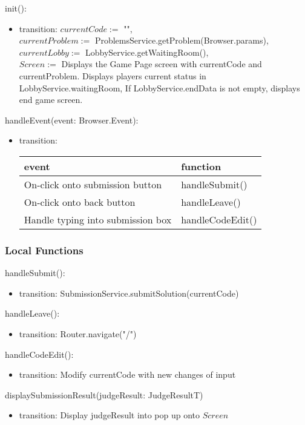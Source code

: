 \documentclass[12pt, titlepage]{article}
\begin{document}
\noindent init():
\begin{itemize}
\item transition: $currentCode :=$ "",\\
$currentProblem :=$ ProblemsService.getProblem(Browser.params),\\
$currentLobby :=$ LobbyService.getWaitingRoom(),\\
$Screen :=$ Displays the Game Page screen with currentCode and currentProblem. Displays players current status in LobbyService.waitingRoom, If LobbyService.endData is not empty, displays end game screen.
\end{itemize}



\noindent handleEvent(event: Browser.Event):
\begin{itemize}
\item transition: \begin{tabular}{p{5cm} p{4cm}}
\hline
\textbf{event} & \textbf{function} \\
\hline
On-click onto submission button & handleSubmit() \\
On-click onto back button & handleLeave() \\
Handle typing into submission box & handleCodeEdit() \\
\hline
\end{tabular}
    
\end{itemize}

\subsubsection{Local Functions}

\noindent handleSubmit():
\begin{itemize}
\item transition: SubmissionService.submitSolution(currentCode)
\end{itemize}

\noindent handleLeave():
\begin{itemize}
\item transition: Router.navigate("/")
\end{itemize}

\noindent handleCodeEdit():
\begin{itemize}
\item transition: Modify currentCode with new changes of input
\end{itemize}

\noindent displaySubmissionResult(judgeResult: JudgeResultT)
\begin{itemize}
\item transition: Display judgeResult into pop up onto $Screen$
\end{itemize}
\end{document}
